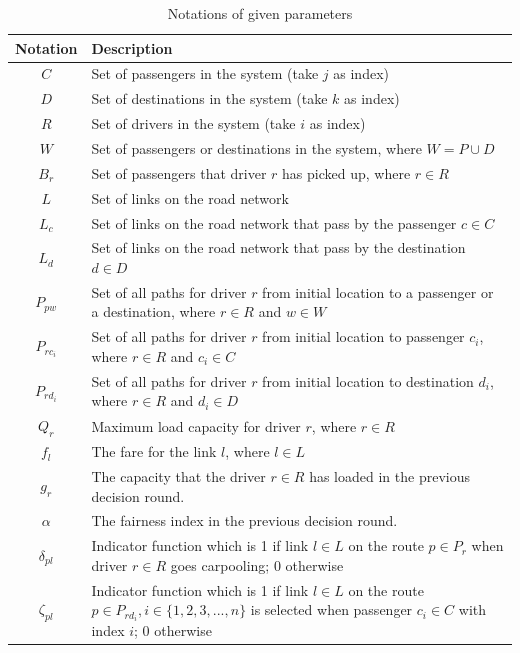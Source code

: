 \renewcommand\arraystretch{1.5}
\par
\begin{table}[ht]
  \centering
  \caption{Notations of given parameters}
  \begin{tabularx}{\textwidth}{cX}
  \toprule
  Notation & Description \\
  \midrule
    $C$ & Set of passengers in the system (take $j$ as index) \\
    $D$ & Set of destinations in the system (take $k$ as index) \\
    $R$ & Set of drivers in the system (take $i$ as index) \\
    $W$ & Set of passengers or destinations in the system, where $W = P \cup D$ \\
    $B_r$ & Set of passengers that driver $r$ has picked up, where $r \in R$ \\
    $L$ & Set of links on the road network \\
    $L_c$ & Set of links on the road network that pass by the passenger $c \in C$ \\
    $L_d$ & Set of links on the road network that pass by the destination $d \in D$ \\
    $P_{pw}$ & Set of all paths for driver $r$ from initial location to a passenger or a destination, where $r \in R$ and $w \in W$ \\
    $P_{rc_i}$ & Set of all paths for driver $r$ from initial location to passenger $c_i$, where $r \in R$ and $c_i \in C$ \\
    $P_{rd_i}$ & Set of all paths for driver $r$ from initial location to destination $d_i$, where $r \in R$ and $d_i \in D$ \\
    $Q_r$ & Maximum load capacity for driver $r$, where $r \in R$ \\
    $f_l$ & The fare for the link $l$, where $l \in L$ \\
    $g_r$ & The capacity that the driver $r \in R$ has loaded in the previous decision round. \\
    $\alpha$ & The fairness index in the previous decision round. \\
    $\delta_{pl}$ & Indicator function which is 1 if link $l \in L$ on the route $p \in P_r$ when driver $r \in R$ goes carpooling; 0 otherwise \\
    $\zeta_{pl}$ & Indicator function which is 1 if link $l \in L$ on the route $p \in P_{rd_i}, i \in \{1,2,3,...,n\}$ is selected when passenger $c_i \in C$ with index $i$; 0 otherwise \\
  \bottomrule
  \end{tabularx}
\end{table}  
\par

